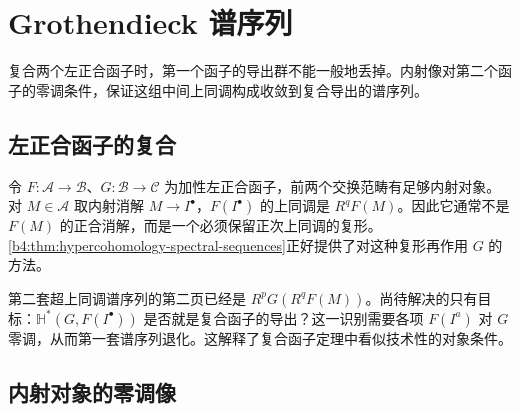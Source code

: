 
\section{Grothendieck 谱序列}
\label{b4:sec:1503}

复合两个左正合函子时，第一个函子的导出群不能一般地丢掉。内射像对第二个函子的零调条件，保证这组中间上同调构成收敛到复合导出的谱序列。

%
%

\subsection{左正合函子的复合}
\label{b4:subsec:1503:01}

令 \(F:\mathcal A\to\mathcal B\)、\(G:\mathcal B\to\mathcal C\) 为加性左正合函子，前两个交换范畴有足够内射对象。对 \(M\in\mathcal A\) 取内射消解 \(M\to I^\bullet\)，\(F(I^\bullet)\) 的上同调是 \(R^qF(M)\)。因此它通常不是 \(F(M)\) 的正合消解，而是一个必须保留正次上同调的复形。\cref{b4:thm:hypercohomology-spectral-sequences}正好提供了对这种复形再作用 \(G\) 的方法。

\ProseParagraphBreak
第二套超上同调谱序列的第二页已经是 \(R^pG(R^qF(M))\)。尚待解决的只有目标：\(\mathbb H^*(G,F(I^\bullet))\) 是否就是复合函子的导出？这一识别需要各项 \(F(I^a)\) 对 \(G\) 零调，从而第一套谱序列退化。这解释了复合函子定理中看似技术性的对象条件。

\subsection{内射对象的零调像}
\label{b4:subsec:1503:02}

